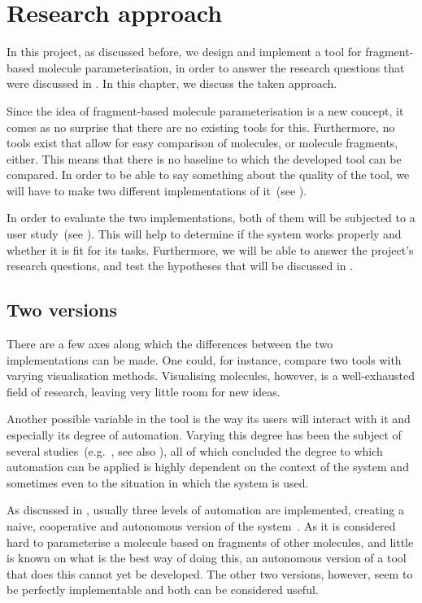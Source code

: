 \chapter{Research approach}

In this project, as discussed before, we design and implement a tool for fragment-based molecule parameterisation, in order to answer the research questions that were discussed in . In this chapter, we discuss the taken approach. 

Since the idea of fragment-based molecule parameterisation is a new concept, it comes as no surprise that there are no existing tools for this. Furthermore, no tools exist that allow for easy comparison of molecules, or molecule fragments, either. This means that there is no baseline to which the developed tool can be compared. In order to be able to say something about the quality of the tool, we will have to make two different implementations of it~(see ).

In order to evaluate the two implementations, both of them will be subjected to a user study~(see ). This will help to determine if the system works properly and whether it is fit for its tasks. Furthermore, we will be able to answer the project's research questions, and test the hypotheses that will be discussed in .


\section{Two versions}
There are a few axes along which the differences between the two implementations can be made. One could, for instance, compare two tools with varying visualisation methods. Visualising molecules, however, is a well-exhausted field of research, leaving very little room for new ideas.

Another possible variable in the tool is the way its users will interact with it and especially its degree of automation. Varying this degree has been the subject of several studies~(e.g.~\cite{payne2000varying, horvitz1999principles, marcus1987taking, norman1990problem}, see also ), all of which concluded the degree to which automation can be applied is highly dependent on the context of the system and sometimes even to the situation in which the system is used.

As discussed in , usually three levels of automation are implemented, creating a naive, cooperative and autonomous version of the system~\cite{payne2000varying}. As it is considered hard to parameterise a molecule based on fragments of other molecules, and little is known on what is the best way of doing this, an autonomous version of a tool that does this cannot yet be developed. The other two versions, however, seem to be perfectly implementable and both can be considered useful.

